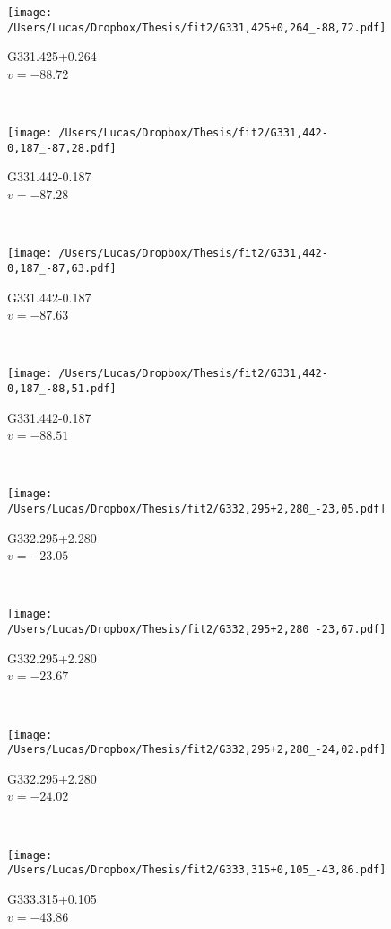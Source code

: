 \begin{figure*}[t]\ContinuedFloat
	\centering
	\begin{subfigure}[t]{0.3\textwidth}
		\texttt{[image: /Users/Lucas/Dropbox/Thesis/fit2/G331,425+0,264\_-88,72.pdf]}
		\caption[]{G331.425+0.264\\$v=-88.72$\,\kms}
	\end{subfigure}
	~
	\begin{subfigure}[t]{0.3\textwidth}
		\texttt{[image: /Users/Lucas/Dropbox/Thesis/fit2/G331,442-0,187\_-87,28.pdf]}
		\caption[]{G331.442-0.187\\$v=-87.28$\,\kms}
	\end{subfigure}
	~
	\begin{subfigure}[t]{0.3\textwidth}
		\texttt{[image: /Users/Lucas/Dropbox/Thesis/fit2/G331,442-0,187\_-87,63.pdf]}
		\caption[]{G331.442-0.187\\$v=-87.63$\,\kms}
	\end{subfigure}
	~
	\begin{subfigure}[t]{0.3\textwidth}
		\texttt{[image: /Users/Lucas/Dropbox/Thesis/fit2/G331,442-0,187\_-88,51.pdf]}
		\caption[]{G331.442-0.187\\$v=-88.51$\,\kms}
	\end{subfigure}
	~
	\begin{subfigure}[t]{0.3\textwidth}
		\texttt{[image: /Users/Lucas/Dropbox/Thesis/fit2/G332,295+2,280\_-23,05.pdf]}
		\caption[]{G332.295+2.280\\$v=-23.05$\,\kms}
	\end{subfigure}
	~
	\begin{subfigure}[t]{0.3\textwidth}
		\texttt{[image: /Users/Lucas/Dropbox/Thesis/fit2/G332,295+2,280\_-23,67.pdf]}
		\caption[]{G332.295+2.280\\$v=-23.67$\,\kms}
	\end{subfigure}
	~
	\begin{subfigure}[t]{0.3\textwidth}
		\texttt{[image: /Users/Lucas/Dropbox/Thesis/fit2/G332,295+2,280\_-24,02.pdf]}
		\caption[]{G332.295+2.280\\$v=-24.02$\,\kms}
	\end{subfigure}
	~
	\begin{subfigure}[t]{0.3\textwidth}
		\texttt{[image: /Users/Lucas/Dropbox/Thesis/fit2/G333,315+0,105\_-43,86.pdf]}
		\caption[]{G333.315+0.105\\$v=-43.86$\,\kms}

\end{subfigure}
\end{figure*}
